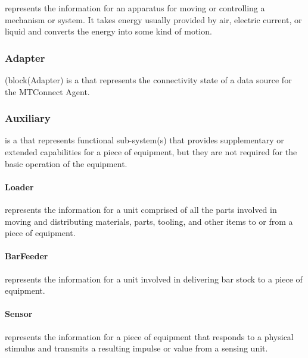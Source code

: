  represents the information for an apparatus for moving or controlling a mechanism or system. It takes energy usually provided by air, electric current, or liquid and converts the energy into some kind of motion.


\subsubsection{Adapter}
\label{sec:Adapter}



{{(block(Adapter)}} is a  that represents the connectivity state of a data source for the \gls{MTConnect Agent}.


\subsubsection{Auxiliary}
\label{sec:Auxiliary}



 is a  that represents functional sub-system(s) that provides supplementary or extended capabilities for a piece of equipment, but they are not required for the basic operation of the equipment.


\paragraph{Loader}\mbox{}
\label{sec:Loader}


 represents the information for a unit comprised of all the parts involved in moving and distributing materials, parts, tooling, and other items to or from a piece of equipment.


\paragraph{BarFeeder}\mbox{}
\label{sec:BarFeeder}


 represents the information for a unit involved in delivering bar stock to a piece of equipment.


\paragraph{Sensor}\mbox{}
\label{sec:Sensor}


 represents the information for a piece of equipment that responds to a physical stimulus and transmits a resulting impulse or value from a sensing unit.


